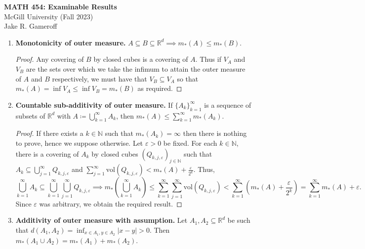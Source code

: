 
\usepackage{todonotes}


\begin{center}
	\textbf{\large MATH 454: Examinable Results} \\
    {\large McGill University (Fall 2023)}
    \\ Jake R. Gameroff 
\end{center}
\begin{enumerate}
	\item \textbf{Monotonicity of outer measure.} \( A \subseteq B \subseteq \mathbb{R}^{d} \implies m_*(A) \leq m_*(B).\) 
		\begin{proof}\renewcommand{\qedsymbol}{}
		Any covering of \( B \) by closed cubes is a covering of \( A \). Thus if \( V_A \) and \( V_B \) are the sets over which we take the infimum to attain the outer measure of \( A \) and \( B \) respectively, we must have that \( V_B \subseteq V_A \) so that \(m_*(A) = \inf V_A \leq \inf V_B = m_*(B) \) as required.
	        \end{proof}
	\item \textbf{Countable sub-additivity of outer measure.} If \( \{ A_k \}_{k=1} ^{\infty}  \) is a sequence of subsets of \( \mathbb{R}^{d}  \) with \(A \coloneqq \bigcup_{k=1}^{\infty} A_k \), then \( m_*(A) \leq \sum_{k=1}^{\infty}m_*(A_k)   \).
	\begin{proof}\renewcommand{\qedsymbol}{}
	If there exists a \( k \in \mathbb{N}  \) such that \( m_*(A_k) = \infty \) then there is nothing to prove, hence we suppose otherwise. Let \( \varepsilon > 0 \) be fixed. For each \( k \in \mathbb{N}  \), there is a covering of \( A_k \) by closed cubes \( (Q_{k,j,\varepsilon })_{j \in \mathbb{N} }   \) such that \( A_k \subseteq \bigcup_{j=1}^{\infty} Q_{k,j,\varepsilon }  \) and \( \sum_{j=1}^{\infty}\mbox{vol}(Q_{k,j,\varepsilon } ) < m_*(A) + \frac{\varepsilon }{2^{k} }  \). Thus, \[\bigcup_{k=1}^{\infty} A_k \subseteq \bigcup_{k=1}^{\infty} \bigcup_{j=1}^{\infty} Q_{k,j,\varepsilon } \implies m_*\left ( {\bigcup_{k=1}^{\infty} A_k} \right ) \leq \sum_{k=1}^{\infty}\sum_{j=1}^{\infty} \mbox{vol}(Q_{k,j,\varepsilon } ) < \sum_{k=1}^{\infty} \left(m_*(A) + \frac{\varepsilon }{2^{k} } \right)  = \sum_{k=1}^{\infty}m_*(A) + \varepsilon .  \] Since \( \varepsilon  \) was arbitrary, we obtain the required result.
\end{proof}
\item \textbf{Additivity of outer measure with assumption.} Let \( A_1, A_2 \subseteq \mathbb{R}^{d}  \) be such that \( d(A_1, A_2) = \inf_{x \in A_1, y \in A_2}|x-y|  > 0 \). Then \( m_*(A_1 \cup A_2) = m_*(A_1) + m_*(A_2)   \).

\end{enumerate}
